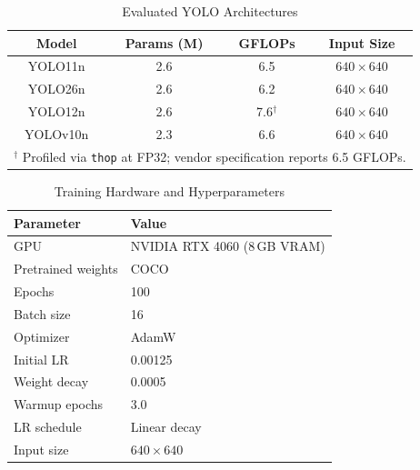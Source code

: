 \documentclass[conference]{IEEEtran}
\begin{document}
\begin{table}[htbp]
\caption{Evaluated YOLO Architectures}
\label{tab:models}
\begin{center}
\begin{tabular}{|c|c|c|c|}
\hline
\textbf{Model} & \textbf{Params (M)} & \textbf{GFLOPs} & \textbf{Input Size} \\
\hline
YOLO11n  & 2.6 & 6.5 & $640\times640$ \\
YOLO26n  & 2.6 & 6.2 & $640\times640$ \\
YOLO12n  & 2.6 & 7.6$^{\dagger}$ & $640\times640$ \\
YOLOv10n & 2.3 & 6.6 & $640\times640$ \\
\hline
\multicolumn{4}{l}{\footnotesize $^{\dagger}$ Profiled via \texttt{thop} at FP32; vendor specification reports 6.5 GFLOPs.}
\end{tabular}
\end{center}
\end{table}

\begin{table}[htbp]
\caption{Training Hardware and Hyperparameters}
\label{tab:training_config}
\begin{center}
\begin{tabular}{|l|l|}
\hline
\textbf{Parameter} & \textbf{Value} \\
\hline
GPU                & NVIDIA RTX 4060 (8\,GB VRAM) \\
Pretrained weights & COCO \\
Epochs             & 100 \\
Batch size         & 16 \\
Optimizer          & AdamW \\
Initial LR         & 0.00125 \\
Weight decay       & 0.0005 \\
Warmup epochs      & 3.0 \\
LR schedule        & Linear decay \\
Input size         & $640 \times 640$ \\
\hline
\end{tabular}
\end{center}
\end{table}
\end{document}
